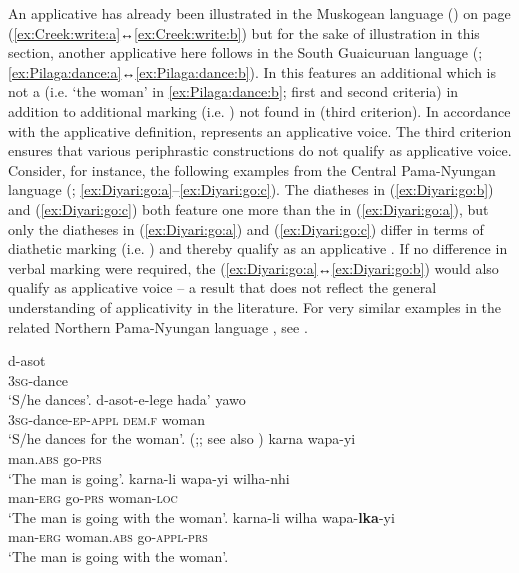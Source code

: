 An applicative  has already been illustrated in the Muskogean language  () on page \pageref{ex:Creek:write:a} (\ref{ex:Creek:write:a}↔\ref{ex:Creek:write:b}) but for the sake of illustration in this section, another applicative  here follows in the South Guaicuruan language  (; \ref{ex:Pilaga:dance:a}↔\ref{ex:Pilaga:dance:b}). In this   features an additional  which is not a  (i.e. ‘the woman’ in \ref{ex:Pilaga:dance:b}; first and second criteria) in addition to additional marking (i.e. ) not found in  (third criterion). In accordance with the applicative definition,  represents an applicative voice. The third criterion ensures that various periphrastic constructions do not qualify as applicative voice. Consider, for instance, the following examples from the Central Pama-Nyungan language  (; \ref{ex:Diyari:go:a}--\ref{ex:Diyari:go:c}). The diatheses in (\ref{ex:Diyari:go:b}) and (\ref{ex:Diyari:go:c}) both feature one  more than the  in (\ref{ex:Diyari:go:a}), but only the diatheses in (\ref{ex:Diyari:go:a}) and (\ref{ex:Diyari:go:c}) differ in terms of diathetic marking (i.e. ) and thereby qualify as an applicative . If no difference in verbal marking were required, the  (\ref{ex:Diyari:go:a}↔\ref{ex:Diyari:go:b}) would also qualify as applicative voice -- a result that does not reflect the general understanding of applicativity in the literature. For very similar examples in the related Northern Pama-Nyungan language , see \cite[109]{dixon:1977}.

\ea {} \citep[318]{vidal:2001}
\ea\label{ex:Pilaga:dance:a}
	\gll	d-asot				\\
			\textsc{3sg}-dance	\\
	\glt	‘S/he dances’.
\ex\label{ex:Pilaga:dance:b}
	\gll	d-asot-e-lege 							hada’ 			yawo	\\
			\textsc{3sg}-dance-\textsc{ep-appl} 	\textsc{dem.f} 	woman	\\
	\glt	‘S/he dances for the woman’.
	\z 
\z \newpage
\ea {} (\citealt[4f.]{austin:2005};; see also \citealt[264]{kittila:2002})
\ea\label{ex:Diyari:go:a}
	\gll	karna				wapa-yi			\\
			man.\textsc{abs}	go-\textsc{prs}	\\
	\glt	‘The man is going’.
\ex\label{ex:Diyari:go:b}
	\gll	karna-li			wapa-yi			wilha-nhi			\\
			man-\textsc{erg}	go-\textsc{prs}	woman-\textsc{loc}	\\
	\glt	‘The man is going with the woman’.
\ex\label{ex:Diyari:go:c}
	\gll	karna-li			wilha				wapa-\textbf{lka}-yi	\\
			man-\textsc{erg}	woman.\textsc{abs}	go-\textsc{appl-prs}	\\
	\glt	‘The man is going with the woman’.
	\z 
\z

